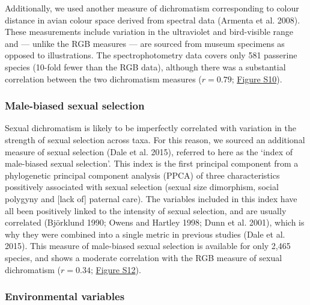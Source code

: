 \documentclass[]{article}
\begin{document}
Additionally, we used another measure of dichromatism corresponding to
colour distance in avian colour space derived from spectral data
(Armenta et al. 2008). These measurements include variation in the
ultraviolet and bird-visible range and --- unlike the RGB measures ---
are sourced from museum specimens as opposed to illustrations. The
spectrophotometry data covers only 581 passerine species (10-fold fewer
than the RGB data), although there was a substantial correlation between
the two dichromatism measures (\(r = 0.79\);
\href{https://justincally.github.io/SexualSelection_Speciation/#subsetted_analysis_with_spectrophotometry_data}{Figure S10}).

\hypertarget{male-biased-sexual-selection}{%
\subsubsection{Male-biased sexual
selection}\label{male-biased-sexual-selection}}

Sexual dichromatism is likely to be imperfectly correlated with
variation in the strength of sexual selection across taxa. For this
reason, we sourced an additional measure of sexual selection (Dale et
al. 2015), referred to here as the `index of male-biased sexual
selection'. This index is the first principal component from a
phylogenetic principal component analysis (PPCA) of three
characteristics possitively associated with sexual selection (sexual
size dimorphism, social polygyny and {[}lack of{]} paternal care). The
variables included in this index have all been positively linked to the
intensity of sexual selection, and are usually correlated (Björklund
1990; Owens and Hartley 1998; Dunn et al. 2001), which is why they were
combined into a single metric in previous studies (Dale et al. 2015).
This measure of male-biased sexual selection is available for only 2,465
species, and shows a moderate correlation with the RGB measure of sexual
dichromatism (\(r = 0.34\);
\href{https://justincally.github.io/SexualSelection_Speciation/#analysis_using_male-biased_measure_of_sexual_selection}{Figure S12}).

\hypertarget{environmental-variables}{%
\subsubsection{Environmental variables}\label{environmental-variables}}
\end{document}
